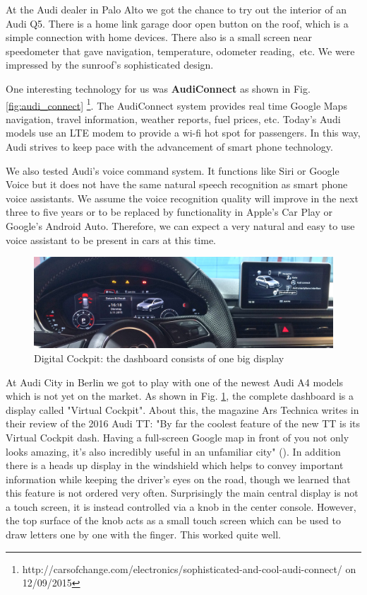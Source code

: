 At the Audi dealer in Palo Alto we got the chance to try out the interior of an Audi Q5. There is a home link garage door open button on the roof, which is a simple connection with home devices. There also is a small screen near speedometer that gave navigation, temperature, odometer reading,~etc. We were impressed by the sunroof's sophisticated design.

One interesting technology for us was \textbf{AudiConnect} as shown in Fig. \ref{fig:audi_connect} \footnote{http://carsofchange.com/electronics/sophisticated-and-cool-audi-connect/ on 12/09/2015}. The AudiConnect system provides real time Google Maps navigation, travel information, weather reports, fuel prices, etc. Today's Audi models use an LTE modem to provide a wi-fi hot spot for passengers. In this way, Audi strives to keep pace with the advancement of smart phone technology.

We also tested Audi's voice command system. It functions like Siri or Google Voice but it does not have the same natural speech recognition as smart phone voice assistants. We assume the voice recognition quality will improve in the next three to five years or to be replaced by functionality in Apple's Car Play or Google's Android Auto. Therefore, we can expect a very natural and easy to use voice assistant to be present in cars at this time.

\begin{figure}[hbt]
\centering
	\includegraphics[keepaspectratio, width=6in]{Figures/BenchmarkingOld/A4_digital_cockpit.jpg}
	\caption{Digital Cockpit: the dashboard consists of one big display}
	\label{fig:digital_cockpit}
\end{figure}

\clearpage

At Audi City in Berlin we got to play with one of the newest Audi A4 models which is not yet on the market. As shown in Fig. \ref{fig:digital_cockpit}, the complete dashboard is a display called "Virtual Cockpit". About this, the magazine Ars Technica writes in their review of the 2016 Audi TT: "By far the coolest feature of the new TT is its Virtual Cockpit dash. Having a full-screen Google map in front of you not only looks amazing, it's also incredibly useful in an unfamiliar city" (\cite{ArsTTReview}). In addition there is a heads up display in the windshield which helps to convey important information while keeping the driver's eyes on the road, though we learned that this feature is not ordered very often. Surprisingly the main central display is not a touch screen, it is instead controlled via a knob in the center console. However, the top surface of the knob acts as a small touch screen which can be used to draw letters one by one with the finger. This worked quite well.

